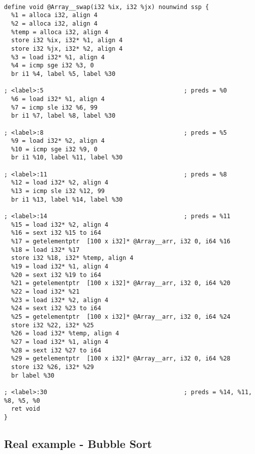 \documentclass[10pt,a4paper]{article}
\begin{document}
\begin{verbatim}

define void @Array__swap(i32 %ix, i32 %jx) nounwind ssp {
  %1 = alloca i32, align 4
  %2 = alloca i32, align 4
  %temp = alloca i32, align 4
  store i32 %ix, i32* %1, align 4
  store i32 %jx, i32* %2, align 4
  %3 = load i32* %1, align 4
  %4 = icmp sge i32 %3, 0
  br i1 %4, label %5, label %30

; <label>:5                                       ; preds = %0
  %6 = load i32* %1, align 4
  %7 = icmp sle i32 %6, 99
  br i1 %7, label %8, label %30

; <label>:8                                       ; preds = %5
  %9 = load i32* %2, align 4
  %10 = icmp sge i32 %9, 0
  br i1 %10, label %11, label %30

; <label>:11                                      ; preds = %8
  %12 = load i32* %2, align 4
  %13 = icmp sle i32 %12, 99
  br i1 %13, label %14, label %30

; <label>:14                                      ; preds = %11
  %15 = load i32* %2, align 4
  %16 = sext i32 %15 to i64
  %17 = getelementptr  [100 x i32]* @Array__arr, i32 0, i64 %16
  %18 = load i32* %17
  store i32 %18, i32* %temp, align 4
  %19 = load i32* %1, align 4
  %20 = sext i32 %19 to i64
  %21 = getelementptr  [100 x i32]* @Array__arr, i32 0, i64 %20
  %22 = load i32* %21
  %23 = load i32* %2, align 4
  %24 = sext i32 %23 to i64
  %25 = getelementptr  [100 x i32]* @Array__arr, i32 0, i64 %24
  store i32 %22, i32* %25
  %26 = load i32* %temp, align 4
  %27 = load i32* %1, align 4
  %28 = sext i32 %27 to i64
  %29 = getelementptr  [100 x i32]* @Array__arr, i32 0, i64 %28
  store i32 %26, i32* %29
  br label %30

; <label>:30                                      ; preds = %14, %11, %8, %5, %0
  ret void
}

\end{verbatim}




\subsection{Real example - Bubble Sort}
\end{document}
